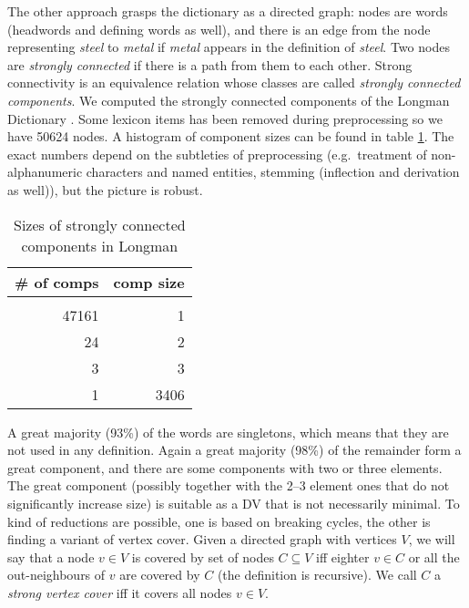 \documentclass[a4paper,10pt]{article}
\begin{document}
The other approach grasps the dictionary as a directed graph: nodes are words (headwords and defining words as well), and there is an edge from the node representing \emph{steel} to \emph{metal} if \emph{metal} appears in the definition of \emph{steel}. Two nodes are \emph{strongly connected} if there is a path from them to each other. Strong connectivity is an equivalence relation whose classes are called \emph{strongly connected components}. We computed the strongly connected components of the Longman Dictionary \cite{Bullon:2003}. Some lexicon items has been removed during preprocessing so we have 50624 nodes. A histogram of component sizes can be found in table \ref{table_compon}. The exact numbers depend on the subtleties of preprocessing (e.g.\ treatment of non-alphanumeric characters and named entities, stemming (inflection and derivation as well)), but the picture is robust.
\begin{table}
 \begin{center}
  \begin{tabular}{rr}
   \toprule
   \# of comps & comp size
   \\\midrule
   \\  47161	& 1
   \\  24	& 2
   \\  3	& 3
   \\  1        & 3406
   \\ \bottomrule
  \end{tabular}
  \caption{Sizes of strongly connected components in Longman}
  \label{table_compon}
 \end{center}
\end{table}
A great majority (93\%) of the words are singletons, which means that they are not used in any definition. Again a great majority (98\%) of the remainder form a great component, and there are some components with two or three elements. The great component (possibly together with the 2--3 element ones that do not significantly increase size) is suitable as a DV that is not necessarily minimal. To kind of reductions are possible, one is based on breaking cycles, the other is finding a variant of vertex cover. Given a directed graph with vertices $V$, we will say that a node $v\in V$ is covered by set of nodes $C\subseteq V$ iff eighter $v\in C$ or all the out-neighbours of $v$ are covered by $C$ (the definition is recursive). We call $C$ a \emph{strong vertex cover} iff it covers all nodes $v\in V$.



\end{document}
